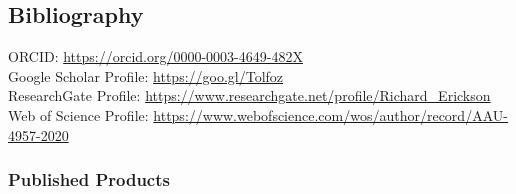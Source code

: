 \subsection{Bibliography}

ORCID: \url{https://orcid.org/0000-0003-4649-482X} \\
Google Scholar Profile: \url{https://goo.gl/Tolfoz} \\
ResearchGate Profile: \url{https://www.researchgate.net/profile/Richard_Erickson} \\
Web of Science Profile: \url{https://www.webofscience.com/wos/author/record/AAU-4957-2020} \\


\subsubsection*{Published Products}


